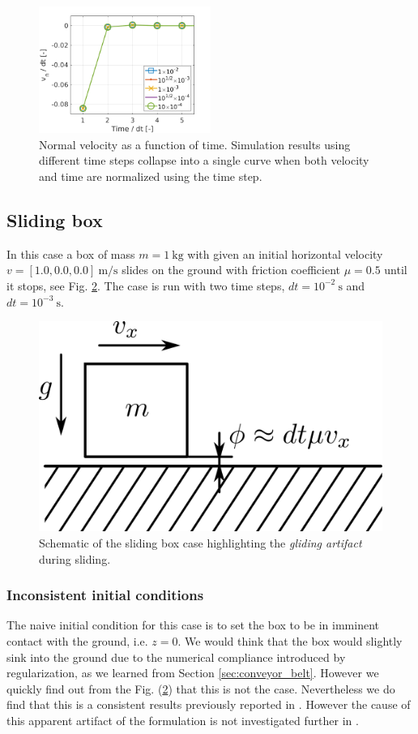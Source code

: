 \begin{figure}[!h]
	\centering
	\includegraphics[width=0.5\textwidth]{figures/conveyor_belt/normal_velocity.png}
	\caption{\label{fig:normal_velocity} 
	Normal velocity as a function of time. Simulation results using different
	time steps collapse into a single curve when both velocity and time are
	normalized using the time step.}
\end{figure}

\subsection{Sliding box}
\label{sec:sliding_box}

In this case a box of mass $m=1~\text{kg}$ with given an initial horizontal
velocity $v=[1.0, 0.0, 0.0]~\text{m}/\text{s}$ slides on the ground with
friction coefficient $\mu=0.5$ until it stops, see Fig. \ref{fig:sliding_box}.
The case is run with two time steps, $dt=10^{-2}~\text{s}$ and
$dt=10^{-3}~\text{s}$.

\begin{figure}[!h]
	\centering
	\includegraphics[width=0.3\columnwidth]{figures/sliding_box/sliding_box.png}
	\caption{\label{fig:sliding_box} 
	Schematic of the sliding box case highlighting the \textit{gliding artifact}
	during sliding.}
\end{figure}

\subsubsection{Inconsistent initial conditions}
The naive initial condition for this case is to set the box to be in imminent
contact with the ground, i.e. $z = 0$. We would think that the box would
slightly sink into the ground due to the numerical compliance introduced by
regularization, as we learned from Section \ref{sec:conveyor_belt}. However we
quickly find out from the Fig. (\ref{fig:sliding_box}) that this is not the
case. Nevertheless we do find that this is a consistent results previously
reported in \cite{bib:mazhar2014}. However the cause of this apparent artifact
of the formulation is not investigated further in \cite{bib:mazhar2014}.

